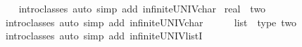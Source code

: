 \begin{isabellebody}
%
\isadelimproof
\ \ %
\endisadelimproof
%
\isatagproof
{}\isamarkupfalse%
\ {\isacharparenleft}intro{\isacharunderscore}classes{\isacharcomma}\ auto\ simp\ add{\isacharcolon}\ infinite{\isacharunderscore}UNIV{\isacharunderscore}char{\isacharunderscore}{}{\isacharparenright}%
\endisatagproof
{\isafoldproof}%
%
\isadelimproof
\isanewline
%
\endisadelimproof
\isanewline
{}\isamarkupfalse%
\ real\ {\isacharcolon}{\isacharcolon}\ two\isanewline
%
\isadelimproof
\ \ %
\endisadelimproof
%
\isatagproof
{}\isamarkupfalse%
\ {\isacharparenleft}intro{\isacharunderscore}classes{\isacharcomma}\ auto\ simp\ add{\isacharcolon}\ infinite{\isacharunderscore}UNIV{\isacharunderscore}char{\isacharunderscore}{}{\isacharparenright}%
\endisatagproof
{\isafoldproof}%
%
\isadelimproof
\isanewline
%
\endisadelimproof
\ \ \ \ \isanewline
{}\isamarkupfalse%
\ list\ {\isacharcolon}{\isacharcolon}\ {\isacharparenleft}type{\isacharparenright}\ two\isanewline
%
\isadelimproof
\ \ %
\endisadelimproof
%
\isatagproof
{}\isamarkupfalse%
\ {\isacharparenleft}intro{\isacharunderscore}classes{\isacharcomma}\ auto\ simp\ add{\isacharcolon}\ infinite{\isacharunderscore}UNIV{\isacharunderscore}listI{\isacharparenright}%
\endisatagproof
{\isafoldproof}%
%
\isadelimproof
\isanewline
%
\endisadelimproof
%
\isadelimtheory
\ \ \ \ \isanewline
%
\endisadelimtheory
%
\isatagtheory
{}\isamarkupfalse%
%
\endisatagtheory
{\isafoldtheory}%
%
\isadelimtheory
%
\endisadelimtheory
%
\end{isabellebody}%
